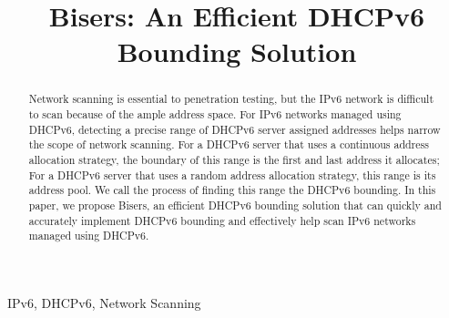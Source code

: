 \documentclass[conference]{IEEEtran}
\begin{document}
\title{Bisers: An Efficient DHCPv6 Bounding Solution}

\author{
  \and
  \and
  \and
}

\maketitle

\begin{abstract}
  Network scanning is essential to penetration testing, but the IPv6
  network is difficult to scan because of the ample address space. For
  IPv6 networks managed using DHCPv6, detecting a precise range of
  DHCPv6 server assigned addresses helps narrow the scope of network
  scanning. For a DHCPv6 server that uses a continuous address
  allocation strategy, the boundary of this range is the first and
  last address it allocates; For a DHCPv6 server that uses a random
  address allocation strategy, this range is its address pool. We call
  the process of finding this range the DHCPv6 bounding. In this
  paper, we propose Bisers, an efficient DHCPv6 bounding solution that
  can quickly and accurately implement DHCPv6 bounding and effectively
  help scan IPv6 networks managed using DHCPv6.
\end{abstract}

\begin{IEEEkeywords}
  IPv6, DHCPv6, Network Scanning
\end{IEEEkeywords}
\end{document}
